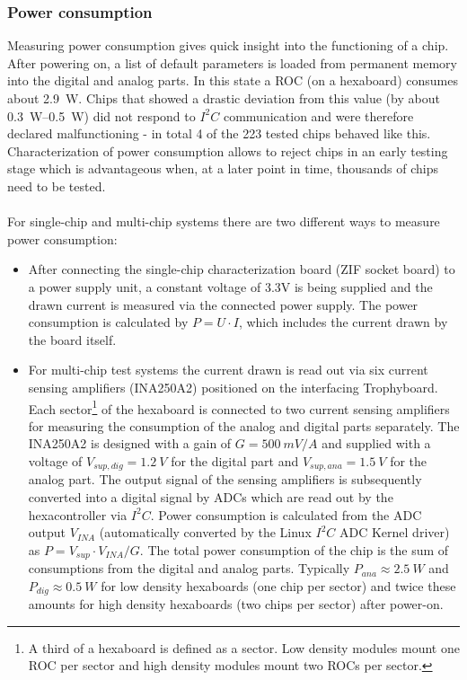 \documentclass[../../main.tex]{subfiles}
\begin{document}
\subsubsection{Power consumption}
Measuring power consumption gives quick insight into the functioning of a chip. After powering on, a list of default parameters is loaded from permanent memory into the digital and analog parts. In this state a ROC (on a hexaboard) consumes about \SI{2.9}{W}. Chips that showed a drastic deviation from this value (by about \SIrange{0.3}{0.5}{W}) did not respond to $I^2C$ communication and were therefore declared malfunctioning - in total 4 of the 223 tested chips behaved like this. Characterization of power consumption allows to reject chips in an early testing stage which is advantageous when, at a later point in time, thousands of chips need to be tested.\\
\\
For single-chip and multi-chip systems there are two different ways to measure power consumption:
\begin{itemize}
\item After connecting the single-chip characterization board (ZIF socket board) to a power supply unit, a constant voltage of 3.3V is being supplied and the drawn current is measured via the connected power supply. The power consumption is calculated by $P = U \cdot I$, which includes the current drawn by the board itself.
\item For multi-chip test systems the current drawn is read out via six current sensing amplifiers (INA250A2\cite{ina250}) positioned on the interfacing Trophyboard. Each sector\footnote{A third of a hexaboard is defined as a sector. Low density modules mount one ROC per sector and high density modules mount two ROCs per sector.} of the hexaboard is connected to two current sensing amplifiers for measuring the consumption of the analog and digital parts separately. The INA250A2 is designed with a gain of $G=\SI{500}{mV/A}$ and supplied with a voltage of $V_{sup,dig} = \SI{1.2}{V}$ for the digital part and $V_{sup,ana} = \SI{1.5}{V}$ for the analog part. The output signal of the sensing amplifiers is subsequently converted into a digital signal by ADCs\cite{schematic:trophy} which are read out by the hexacontroller via $I^2C$. Power consumption is calculated from the ADC output $V_{INA}$ (automatically converted by the Linux $I^2C$ ADC Kernel driver) as $P = V_{sup}\cdot V_{INA} / G$. The total power consumption of the chip is the sum of consumptions from the digital and analog parts. Typically $P_{ana} \approx \SI{2.5}{W}$ and $P_{dig} \approx \SI{0.5}{W}$ for low density hexaboards (one chip per sector) and twice these amounts for high density hexaboards (two chips per sector) after power-on.
\end{itemize}
\end{document}
